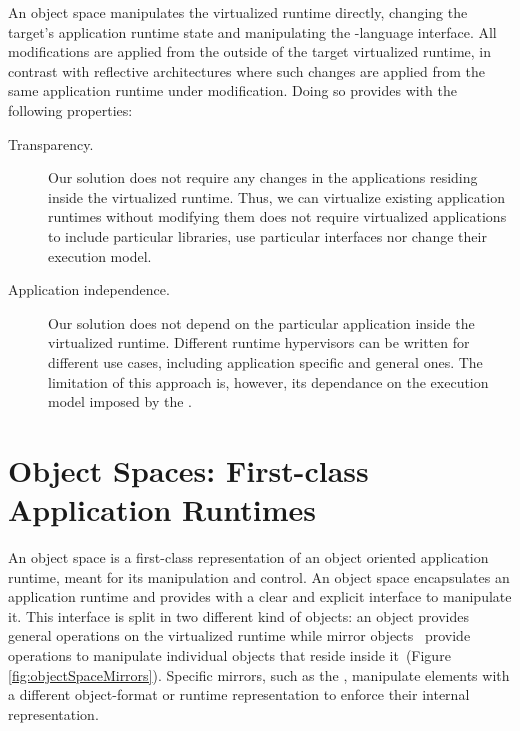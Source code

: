 
An object space manipulates the virtualized runtime directly, changing the target's application runtime state and manipulating the \VM-language interface. All modifications are applied from the outside of the target virtualized runtime, in contrast with reflective architectures where such changes are applied from the same application runtime under modification. Doing so provides \Vtt with the following properties:

\begin{description}
\item[Transparency.] Our solution does not require any changes in the applications residing inside the virtualized runtime. Thus, we can virtualize existing application runtimes without modifying them \ie \Vtt does not require virtualized applications to include particular libraries, use particular interfaces nor change their execution model.

\item[Application independence.] Our solution does not depend on the particular application inside the virtualized runtime. Different runtime hypervisors can be written for different use cases, including application specific and general ones. The limitation of this approach is, however, its dependance on the execution model imposed by the \VM.
\end{description}

\section{Object Spaces: First-class Application Runtimes} \label{sec:object_space}

An object space is a first-class representation of an object oriented application runtime, meant for its manipulation and control. An object space encapsulates an application runtime and provides with a clear and explicit interface to manipulate it. This interface is split in two different kind of objects: an  object provides general operations on the virtualized runtime while mirror objects~\cite{Brac04b} provide operations to manipulate individual objects that reside inside it~(Figure \ref{fig:objectSpaceMirrors}). Specific mirrors, such as the , manipulate elements with a different object-format or runtime representation to enforce their internal representation.

